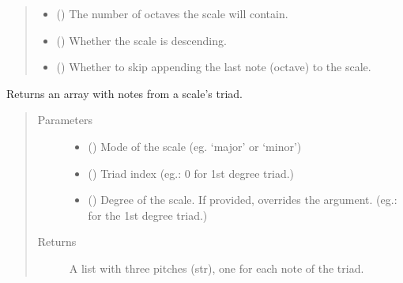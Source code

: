\documentclass[letterpaper,10pt,english]{sphinxmanual}
\begin{document}
\begin{fulllineitems}
\begin{fulllineitems}
\begin{quote}
\begin{description}
\begin{itemize}
\item {} 
 () \textendash{} The number of octaves the scale will contain.

\item {} 
 () \textendash{} Whether the scale is descending.

\item {} 
 () \textendash{} Whether to skip appending the last
note (octave) to the scale.

\end{itemize}

\end{description}\end{quote}

\end{fulllineitems}


\begin{fulllineitems}
\label{\detokenize{birdears:birdears.scale.ChromaticScale.get_triad}}
Returns an array with notes from a scale’s triad.
\begin{quote}\begin{description}
\item[{Parameters}] \leavevmode\begin{itemize}
\item {} 
 () \textendash{} Mode of the scale (eg. ‘major’ or ‘minor’)

\item {} 
 () \textendash{} Triad index (eg.: 0 for 1st degree triad.)

\item {} 
 () \textendash{} Degree of the scale. If provided, overrides the
 argument. (eg.:  for the 1st degree triad.)

\end{itemize}

\item[{Returns}] \leavevmode
A list with three pitches (str), one for each note of the triad.

\end{description}\end{quote}

\end{fulllineitems}


\end{fulllineitems}
\end{document}
